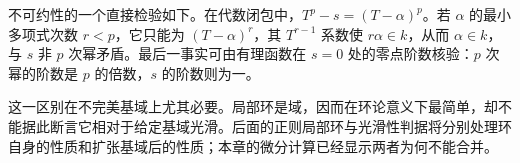 不可约性的一个直接检验如下。在代数闭包中，\(T^p-s=(T-\alpha)^p\)。若 \(\alpha\) 的最小多项式次数 \(r<p\)，它只能为 \((T-\alpha)^r\)，其 \(T^{r-1}\) 系数使 \(r\alpha\in k\)，从而 \(\alpha\in k\)，与 \(s\) 非 \(p\) 次幂矛盾。最后一事实可由有理函数在 \(s=0\) 处的零点阶数核验：\(p\) 次幂的阶数是 \(p\) 的倍数，\(s\) 的阶数则为一。

\ProseParagraphBreak
这一区别在不完美基域上尤其必要。局部环是域，因而在环论意义下最简单，却不能据此断言它相对于给定基域光滑。后面的正则局部环与光滑性判据将分别处理环自身的性质和扩张基域后的性质；本章的微分计算已经显示两者为何不能合并。
